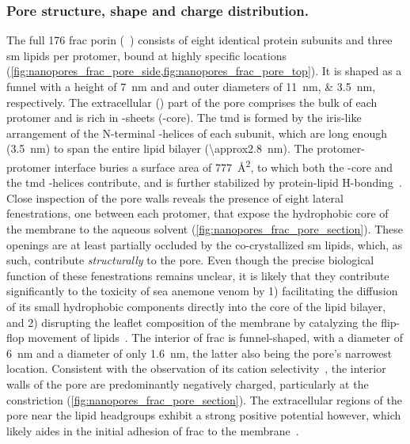 \subsubsection{Pore structure, shape and charge distribution.}

The full \SI{176}{\kDa} \Gls{frac} porin (~\cite{Tanaka-2015}) consists of eight identical protein
subunits and three \gls{sm} lipids per protomer, bound at highly specific locations
(\cref{fig:nanopores_frac_pore_side,fig:nanopores_frac_pore_top}). It is shaped as a funnel with a height of
\SI{7}{\nm} and \cisi{} and \transi{} outer diameters of \SIlist{11;3.5}{\nm}, respectively. The extracellular
(\cisi) part of the pore comprises the bulk of each protomer and is rich in \tb-sheets (\tb-core). The
\gls{tmd} is formed by the iris-like arrangement of the N-terminal \ta-helices of each subunit, which are long
enough (\SI{3.5}{\nm}) to span the entire lipid bilayer (\SI{\approx2.8}{\nm}). The protomer-protomer
interface buries a surface area of \SI{777}{\square\angstrom}, to which both the \tb-core and the \gls{tmd}
\ta-helices contribute, and is further stabilized by protein-lipid H-bonding~\cite{Tanaka-2015}. Close
inspection of the pore walls reveals the presence of eight lateral fenestrations, one between each protomer,
that expose the hydrophobic core of the membrane to the aqueous solvent
(\cref{fig:nanopores_frac_pore_section}). These openings are at least partially occluded by the
co-crystallized \gls{sm} lipids, which, as such, contribute \emph{structurally} to the pore. Even though the
precise biological function of these fenestrations remains unclear, it is likely that they contribute
significantly to the toxicity of sea anemone venom by 1) facilitating the diffusion of its small hydrophobic
components directly into the core of the lipid bilayer, and 2) disrupting the leaflet composition of the
membrane by catalyzing the flip-flop movement of lipids~\cite{Tanaka-2015}. The interior of \gls{frac} is
funnel-shaped, with a \cisi{} diameter of \SI{6}{\nm} and a \trans{} diameter of only \SI{1.6}{\nm}, the
latter also being the pore's narrowest location. Consistent with the observation of its cation
selectivity~\cite{Garcia-Ortega-2011,Wloka-2016}, the interior walls of the pore are predominantly negatively
charged, particularly at the \transi{} constriction (\cref{fig:nanopores_frac_pore_section}). The
extracellular regions of the pore near the lipid headgroups exhibit a strong positive potential however, which
likely aides in the initial adhesion of \gls{frac} to the membrane~\cite{Tanaka-2015}.

